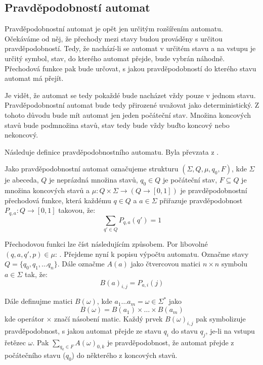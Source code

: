 \documentclass[a4paper,10pt]{article}
\begin{document}

\subsection{Pravděpodobností automat}

Pravděpodobnostní automat je opět jen určitým rozšířením  automatu. Očekáváme od něj, že přechody mezi stavy budou prováděny s určitou pravděpodobností. Tedy, že nachází-li se automat v určitém stavu a na vstupu je určitý symbol, stav, do kterého automat přejde, bude vybrán náhodně. Přechodová funkce pak bude určovat, s jakou pravděpodobností do kterého stavu automat má přejít.

Je vidět, že automat se tedy pokaždé bude nacházet vždy pouze v jednom stavu. Pravděpodobnostní automat bude tedy přirozené uvažovat jako deterministický. Z tohoto důvodu bude mít automat jen jeden počáteční stav. Množina koncových stavů bude  podmnožina stavů, stav tedy bude vždy buďto koncový nebo nekoncový.

Následuje definice pravděpodobnostního automatu. Byla převzata z \cite{Rab-ProbAut}.
\begin{definition}
 Jako pravděpodobnostní automat označujeme strukturu $(\Sigma, Q, \mu, q_0, F)$, kde $\Sigma$ je abeceda, $Q$ je neprázdná množina stavů, $q_0 \in Q$ je počáteční stav, $F \subseteq Q$ je množina koncových stavů a $\mu: Q \times \Sigma \rightarrow (Q \rightarrow [0,1])$ je pravděpodobnostní přechodová funkce, která každému $q \in Q$ a $a \in \Sigma$ přiřazuje pravděpodobnost $P_{q,a}: Q \rightarrow [0,1]$ takovou, že:
 $$   
  \sum_{q' \in Q} P_{q,a}(q') = 1 
 $$
\end{definition}

Přechodovou funkci lze číst následujícím způsobem. Por libovolné $(q, a, q', p) \in \mu$: . Přejdeme nyní k popisu výpočtu automatu. Označme stavy $Q = \{ q_0, q_1, \dots q_n \}$. Dále označme $A(a)$ jako čtvercovou matici $n \times n$ symbolu $a \in \Sigma$ tak, že:
$$
  B(a)_{i, j} = P_{a,i}(j)
$$

Dále definujme matici $B(\omega)$, kde $a_1 \dots a_m = \omega \in \Sigma^*$ jako
$$
  B(\omega) = B(a_1) \times \dots \times B(a_m)
$$
kde operátor $\times$ značí násobení matic. Každý prvek $B(\omega)_{i,j}$ pak symbolizuje pravděpodobnost, s jakou automat přejde ze stavu $q_i$ do stavu $q_j$, je-li na vstupu řetězec $\omega$. Pak $\sum_{q_k \in F} A(\omega)_{0, k}$ je pravděpodobnost, že automat přejde z počátečního stavu ($q_0$) do některého z koncových stavů.
\end{document}
